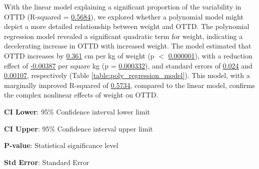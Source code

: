 \documentclass[11pt]{article}
\begin{document}
With the linear model explaining a significant proportion of the variability in OTTD (R-squared = \hyperlink{R1a}{0.5684}), we explored whether a polynomial model might depict a more detailed relationship between weight and OTTD. The polynomial regression model revealed a significant quadratic term for weight, indicating a decelerating increase in OTTD with increased weight. The model estimated that OTTD increases by \hyperlink{C1a}{0.361} cm per kg of weight (p $<$ \hyperlink{C1d}{0.000001}), with a reduction effect of \hyperlink{C2a}{-0.00387} per square kg (p = \hyperlink{C2d}{0.000332}), and standard errors of \hyperlink{C1e}{0.024} and \hyperlink{C2e}{0.00107}, respectively (Table \ref{table:poly_regression_model}). This model, with a marginally improved R-squared of \hyperlink{R2a}{0.5734}, compared to the linear model, confirms the complex nonlinear effects of weight on OTTD.

\begin{table}[h]
\caption{\protect\hyperlink{file-table-2-pkl}{Polynomial regression model with weight predicting OTTD.}}
\label{table:poly_regression_model}
\begin{threeparttable}
\renewcommand{\TPTminimum}{\linewidth}
\begin{tablenotes}
\footnotesize
\item \textbf{CI Lower}: 95\% Confidence interval lower limit
\item \textbf{CI Upper}: 95\% Confidence interval upper limit
\item \textbf{P-value}: Statistical significance level
\item \textbf{Std Error}: Standard Error
\end{tablenotes}
\end{threeparttable}
\end{table}
\end{document}
